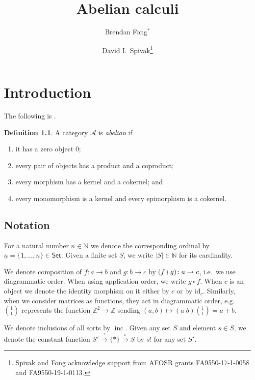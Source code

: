 \documentclass[11pt, oneside, article]{memoir}
\theoremstyle{plain}
\theoremstyle{definition}
\newtheorem{definition}[theorem]{Definition}
\theoremstyle{remark}
\newcommand{\ord}[1]{\underline{#1}}%
\newcommand{\cat}[1]{\mathcal{#1}}%
\newcommand{\Cat}[1]{{\mathsf{#1}}}%
\newcommand{\funn}[1]{\mathrm{#1}}%
\DeclareMathOperator{\inc}{inc}
\newcommand{\smset}{\Cat{Set}}
\newcommand{\nn}{\mathbb{N}}
\newcommand{\zz}{\mathbb{Z}}
\newcommand{\id}{\funn{id}}
\newcommand{\cp}{\mathbin{\fatsemi}}
\newcommand{\To}[1]{\xrightarrow{#1}}
\begin{document}
   

\title{Abelian calculi}
\author{Brendan Fong$^*$ \and David I.\ Spivak\thanks{Spivak and Fong acknowledge support from AFOSR grants FA9550-17-1-0058 and FA9550-19-1-0113.}}
  
\maketitle

\tableofcontents*

\chapter{Introduction}

The following is \cite[1.4.1]{Borceux:1994b}.
\begin{definition}\label{def.abelian}
A category $\cat{A}$ is \emph{abelian} if
\begin{enumerate}
	\item it has a zero object $0$;
	\item every pair of objects has a product and a coproduct;
	\item every morphism has a kernel and a cokernel; and
	\item every monomorphism is a kernel and every epimorphism is a cokernel.
\end{enumerate}
\end{definition}

\section{Notation}\label{sec.notation}
For a natural number $n\in\nn$ we denote the corresponding ordinal by $\ord{n}=\{1,\ldots,n\}\in\smset$. Given a finite set $S$, we write $|S|\in\nn$ for its cardinality.

We denote composition of $f\colon a\to b$ and $g\colon b\to c$ by $(f\cp g)\colon a\to c$, i.e.\ we use diagrammatic order. When using application order, we write $g\circ f$. When $c$ is an object we denote the identity morphism on it either by $c$ or by $\id_c$. Similarly, when we consider matrices as functions, they act in diagrammatic order, e.g. $1\choose 1$ represents the function $\zz^2\to\zz$ sending $(a,b)\mapsto (a\; b){1 \choose 1}=a+b$.

We denote inclusions of all sorts by $\inc$. Given any set $S$ and element $s\in S$, we denote the constant function $S'\To{!}\{*\}\To{s}S$ by $s!$ for any set $S'$.
\end{document}
